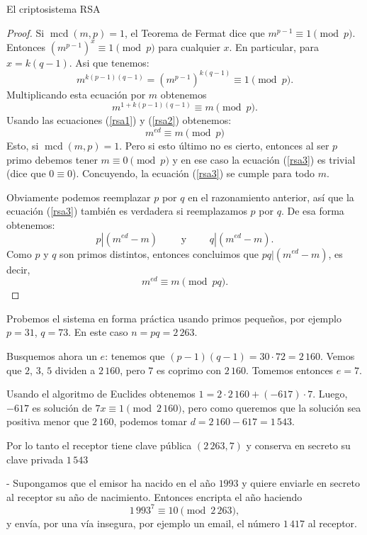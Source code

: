 \begin{section}{El criptosistema RSA}
\begin{proof}
Si $\operatorname{mcd}(m, p) = 1$, el Teorema de Fermat dice que $m^{p - 1}  \equiv 1\pmod{p}$.
Entonces $(m^{p - 1})^x \equiv 1\pmod{p}$ para cualquier $x$. En particular, para 
$x = k(q-1)$. Asi que tenemos:
\begin{equation*}
m^{k(p-1)(q-1)} = (m^{p-1})^{k(q-1)} \equiv 1\pmod{p}.
\end{equation*}
Multiplicando esta ecuación por $m$ obtenemos
\begin{equation}\label{rsa2}
m^{1+k(p-1)(q-1)} \equiv m\pmod{p}. 
\end{equation}
Usando las ecuaciones (\ref{rsa1}) y (\ref{rsa2}) obtenemos:
\begin{equation}\label{rsa3}
m^{ed} \equiv m\pmod{p} 
\end{equation}
Esto, si  $\operatorname{mcd}(m, p) = 1$. Pero si esto último no es cierto, entonces al ser $p$
primo debemos tener $m \equiv 0\pmod{p}$ y en ese caso la ecuación (\ref{rsa3}) es trivial (dice que $0 \equiv 0$). Concuyendo, la ecuación (\ref{rsa3}) se cumple para todo $m$.

Obviamente podemos reemplazar $p$ por $q$ en el razonamiento anterior, así que la ecuación (\ref{rsa3}) también es verdadera si reemplazamos $p$ por $q$. De esa forma obtenemos:
$$p|(m^{ed}-m) \qquad \text{ y } \qquad q|(m^{ed}-m).$$
Como $p$ y $q$ son primos distintos, entonces concluimos que $pq|(m^{ed}-m)$, es decir, $$m^{ed} \equiv m \pmod{pq}.$$
\end{proof}

\begin{ejemplo*} Probemos el sistema en forma práctica usando primos pequeños, por ejemplo $p=31$, $q=73$. En este caso $n = pq = 2\,263$. 

Busquemos ahora un $e$:  tenemos que $ (p-1)(q-1)= 30\cdot 72 = 2\,160$. Vemos que $2$, $3$, $5$ dividen a $2\,160$, pero $7$ es coprimo con $2\,160$. 
Tomemos entonces $e = 7$.

Usando el algoritmo de Euclides obtenemos $1 = 2\cdot 2\,160 + (-617)\cdot 7$. Luego, $-617$  es solución de $7x \equiv 1 \pmod{2\,160}$, pero como queremos que la solución sea positiva menor que $2\,160$, podemos tomar $d = 2\,160 -617 =1\,543$. 

Por lo tanto el receptor tiene clave pública $(2\,263, 7)$ y conserva en secreto  su clave privada $1\,543$

- Supongamos que el emisor ha nacido en el año $1993$ y quiere enviarle en secreto al receptor su año de nacimiento. Entonces encripta el año haciendo 
$$
1\,993^7 \equiv 10 \pmod{2\,263},
$$   
y envía, por una vía insegura, por ejemplo un email, el número $1\,417$ al receptor.


\end{ejemplo*}
\end{section}
